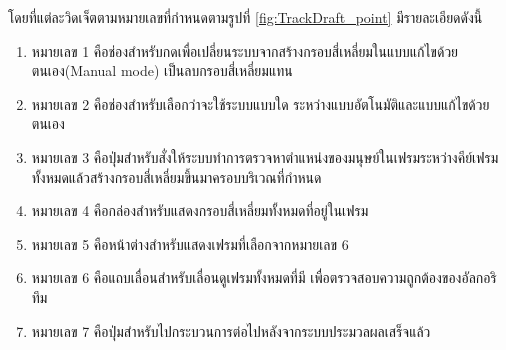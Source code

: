 โดยที่แต่ละวิดเจ็ตตามหมายเลขที่กำหนดตามรูปที่ \ref{fig:TrackDraft_point} มีรายละเอียดดังนี้
\begin{enumerate}
	\setlength\itemsep{-0.25em}
    \item หมายเลข 1 คือช่องสำหรับกดเพื่อเปลี่ยนระบบจากสร้างกรอบสี่เหลี่ยมในแบบแก้ไขด้วยตนเอง(Manual mode) เป็นลบกรอบสี่เหลี่ยมแทน
    \item หมายเลข 2 คือช่องสำหรับเลือกว่าจะใช้ระบบแบบใด ระหว่างแบบอัตโนมัติและแบบแก้ไขด้วยตนเอง
    \item หมายเลข 3 คือปุ่มสำหรับสั่งให้ระบบทำการตรวจหาตำแหน่งของมนุษย์ในเฟรมระหว่างคีย์เฟรมทั้งหมดแล้วสร้างกรอบสี่เหลี่ยมขึ้นมาครอบบริเวณที่กำหนด
	\item หมายเลข 4 คือกล่องสำหรับแสดงกรอบสี่เหลี่ยมทั้งหมดที่อยู่ในเฟรม
	\item หมายเลข 5 คือหน้าต่างสำหรับแสดงเฟรมที่เลือกจากหมายเลข 6
	\item หมายเลข 6 คือแถบเลื่อนสำหรับเลื่อนดูเฟรมทั้งหมดที่มี เพื่อตรวจสอบความถูกต้องของอัลกอริทึม
	\item หมายเลข 7 คือปุ่มสำหรับไปกระบวนการต่อไปหลังจากระบบประมวลผลเสร็จแล้ว
\end{enumerate}
\clearpage


